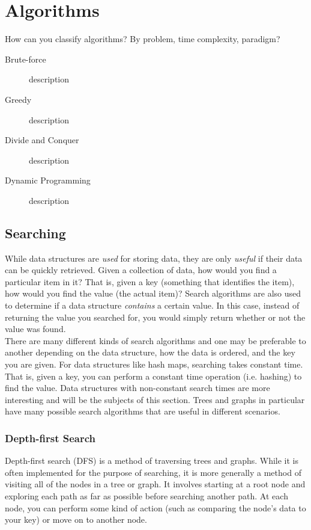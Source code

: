 \chapter{Algorithms}

How can you classify algorithms? By problem, time complexity, paradigm? 

\begin{description}
    \item[Brute-force] description
    \item[Greedy] description
    \item[Divide and Conquer] description
    \item[Dynamic Programming] description
\end{description}

\section{Searching}

While data structures are \textit{used} for storing data, they are only \textit{useful} if their data can be quickly retrieved. Given a collection of data, how would you find a particular item in it? That is, given a key (something that identifies the item), how would you find the value (the actual item)? Search algorithms are also used to determine if a data structure \textit{contains} a certain value. In this case, instead of returning the value you searched for, you would simply return whether or not the value was found. \\

There are many different kinds of search algorithms and one may be preferable to another depending on the data structure, how the data is ordered, and the key you are given. For data structures like hash maps, searching takes constant time. That is, given a key, you can perform a constant time operation (i.e. hashing) to find the value. Data structures with non-constant search times are more interesting and will be the subjects of this section. Trees and graphs in particular have many possible search algorithms that are useful in different scenarios.

\subsection{Depth-first Search}

Depth-first search (DFS) is a method of traversing trees and graphs. While it is often implemented for the purpose of searching, it is more generally a method of visiting all of the nodes in a tree or graph. It involves starting at a root node and exploring each path as far as possible before searching another path. At each node, you can perform some kind of action (such as comparing the node's data to your key) or move on to another node. \\

